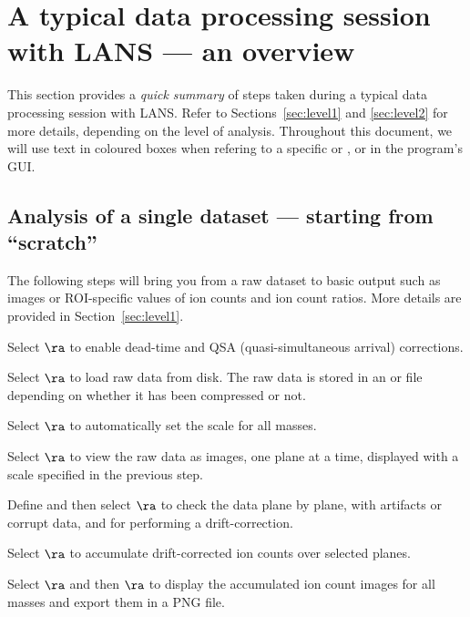 \section{A typical data processing session with LANS --- an overview}

This section provides a \emph{quick summary} of steps taken during a typical data processing session with LANS. Refer to Sections~\ref{sec:level1} and \ref{sec:level2} for more details, depending on the level of analysis. Throughout this document, we will use text in coloured boxes when refering to a specific  or ,  or  in the program's GUI.


\subsection{Analysis of a single dataset --- starting from ``scratch''}
\label{sec:analysis_from_scratch}
\setcounter{step}{0}

The following steps will bring you from a raw dataset to basic output such as images or ROI-specific values of ion counts and ion count ratios. More details are provided in Section~\ref{sec:level1}.

\s Select  $\ra$  to enable dead-time and QSA (quasi-simultaneous arrival) corrections.

\s Select  $\ra$  to load raw data from disk. The raw data is stored in an  or  file depending on whether it has been compressed or not.

\s Select  $\ra$  to automatically set the scale for all masses. 

\s Select  $\ra$  to view the raw data as images, one plane at a time, displayed with a scale specified in the previous step. 

\s Define  and then select  $\ra$  to check the data plane by plane,  with artifacts or corrupt data, and  for performing a drift-correction. 

\s Select  $\ra$  to accumulate drift-corrected ion counts over selected planes.  

\s Select  $\ra$  and then  $\ra$  to display the accumulated ion count images for all masses and export them in a PNG file.

